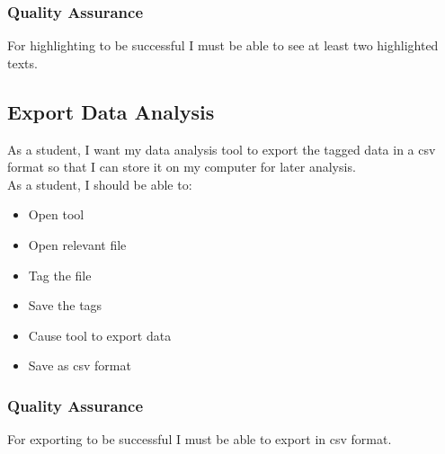 \documentclass{article}
\begin{document}
\subsubsection{Quality Assurance} 
For highlighting to be successful I must be able to see at least two highlighted texts.

\subsection{Export Data Analysis}
As a student, I want my data analysis tool to export the tagged data in a csv format so that I can store it on my computer for later analysis. \\

As a student, I should be able to:
\begin{itemize}
    \item Open tool
    \item Open relevant file
    \item Tag the file
    \item Save the tags
    \item Cause tool to export data
    \item Save as csv format
\end{itemize}

\subsubsection{Quality Assurance}
For exporting to be successful I must be able to export in csv format.
\end{document}
